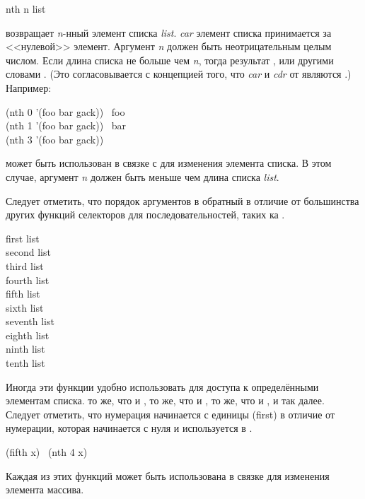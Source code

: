 \begin{defun}[Функция]
nth n list

 возвращает \emph{n}-нный элемент списка
\emph{list}. \emph{car} элемент списка принимается за <<нулевой>> элемент.
Аргумент \emph{n} должен быть неотрицательным целым числом.
Если длина списка не больше чем \emph{n}, тогда результат {\emptylist}, или
другими словами {\nil}.
(Это согласовывается с концепцией того, что \emph{car} и \emph{cdr} от
{\emptylist} являются {\emptylist}.)
Например:
\begin{lisp}
(nth 0 '(foo bar gack)) \EV\ foo \\
(nth 1 '(foo bar gack)) \EV\ bar \\
(nth 3 '(foo bar gack)) \EV\ {\emptylist}
\end{lisp}

 может быть использован в связке с  для изменения элемента
списка. В этом случае, аргумент \emph{n} должен быть меньше чем длина списка
\emph{list}.

Следует отметить, что порядок аргументов в  обратный в отличие от
большинства других функций селекторов для последовательностей, таких ка
.
\end{defun}

\begin{defun}[Функция]
first list \\
second list \\
third list \\
fourth list \\
fifth list \\
sixth list \\
seventh list \\
eighth list \\
ninth list \\
tenth list

Иногда эти функции удобно использовать для доступа к определёнными элементам
списка.
 то же, что и ,  то же, что и ,
 то же, что и , и так далее.
Следует отметить, что нумерация начинается с единицы (first) в отличие от
нумерации, которая начинается с нуля и используется в .
\begin{lisp}
(fifth x) \EQ\ (nth 4 x)
\end{lisp}

Каждая из этих функций может быть использована в связке  для изменения
элемента массива. 
\end{defun}

